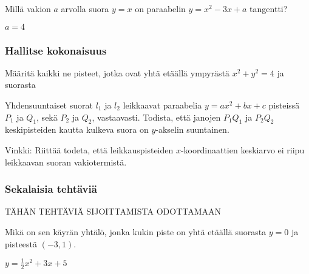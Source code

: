 \begin{tehtavasivu}
\begin{tehtava}
Millä vakion $a$ arvolla suora $y=x$ on paraabelin $y=x^2-3x+a$ tangentti?
\begin{vastaus}
$a=4$
\end{vastaus}
\end{tehtava}

\subsubsection*{Hallitse kokonaisuus}


\begin{tehtava}
Määritä kaikki ne pisteet, jotka ovat yhtä etäällä ympyrästä $x^2+y^2 = 4$ ja suorasta
	\begin{vastaus}
	\end{vastaus}
\end{tehtava}

\begin{tehtava}
Yhdensuuntaiset suorat $l_1$ ja $l_2$ leikkaavat paraabelia $y = ax^2+bx+c$ pisteissä $P_1$ ja $Q_1$, sekä $P_2$ ja $Q_2$, vastaavasti. Todista, että janojen $P_1 Q_1$ ja $P_2 Q_2$ keskipisteiden kautta kulkeva suora on $y$-akselin suuntainen.
	\begin{vastaus}
		Vinkki: Riittää todeta, että leikkauspisteiden $x$-koordinaattien keskiarvo ei riipu 		leikkaavan suoran vakiotermistä.
	\end{vastaus}
\end{tehtava}

\subsubsection*{Sekalaisia tehtäviä}

TÄHÄN TEHTÄVIÄ SIJOITTAMISTA ODOTTAMAAN

\begin{tehtava}
Mikä on sen käyrän yhtälö, jonka kukin piste on yhtä etäällä suorasta $y=0$ ja pisteestä $(-3, 1)$.
\begin{vastaus}
$y = \frac{1}{2}x^2+3 x+5$
\end{vastaus}
\end{tehtava}


\end{tehtavasivu}

